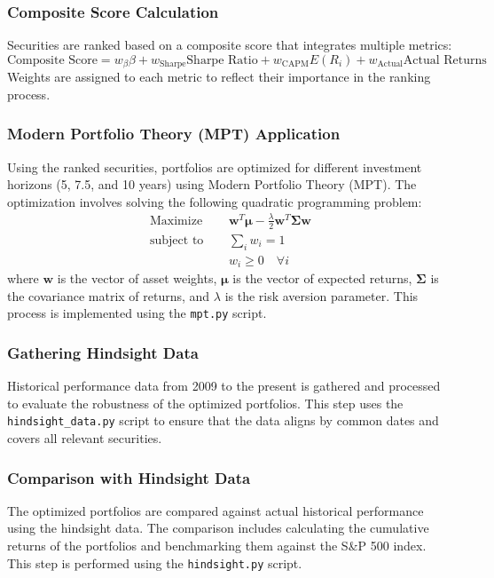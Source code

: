 \subsubsection{Composite Score Calculation}
Securities are ranked based on a composite score that integrates multiple metrics:
\begin{equation}
    \text{Composite Score} = w_{\beta} \beta + w_{\text{Sharpe}} \text{Sharpe Ratio} + w_{\text{CAPM}} E(R_i) + w_{\text{Actual}} \text{Actual Returns}
\end{equation}
Weights are assigned to each metric to reflect their importance in the ranking process.

\subsubsection{Modern Portfolio Theory (MPT) Application}
Using the ranked securities, portfolios are optimized for different investment horizons (5, 7.5, and 10 years) using Modern Portfolio Theory (MPT). The optimization involves solving the following quadratic programming problem:
\begin{align}
    \text{Maximize } & \quad \mathbf{w}^T \mathbf{\mu} - \frac{\lambda}{2} \mathbf{w}^T \mathbf{\Sigma} \mathbf{w} \\
    \text{subject to} & \quad \sum_{i} w_i = 1 \\
    & \quad w_i \geq 0 \quad \forall i
\end{align}
where \(\mathbf{w}\) is the vector of asset weights, \(\mathbf{\mu}\) is the vector of expected returns, \(\mathbf{\Sigma}\) is the covariance matrix of returns, and \(\lambda\) is the risk aversion parameter. This process is implemented using the \texttt{mpt.py} script.

\subsubsection{Gathering Hindsight Data}
Historical performance data from 2009 to the present is gathered and processed to evaluate the robustness of the optimized portfolios. This step uses the \texttt{hindsight\_data.py} script to ensure that the data aligns by common dates and covers all relevant securities.

\subsubsection{Comparison with Hindsight Data}
The optimized portfolios are compared against actual historical performance using the hindsight data. The comparison includes calculating the cumulative returns of the portfolios and benchmarking them against the S\&P 500 index. This step is performed using the \texttt{hindsight.py} script.

